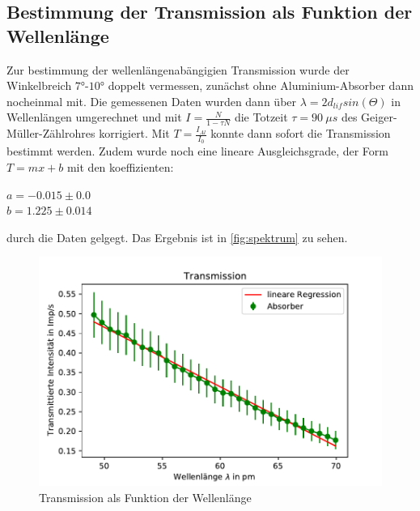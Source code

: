 \subsection{Bestimmung der Transmission als Funktion der Wellenlänge}
\label{sec:transmission}
Zur bestimmung der wellenlängenabängigien Transmission wurde der Winkelbreich $7°$-$10°$ doppelt vermessen,
zunächst ohne Aluminium-Absorber dann nocheinmal mit. Die gemessenen Daten wurden dann über $\lambda=2d_{lif}sin(\Theta)$
in Wellenlängen umgerechnet und mit $I=\frac{N}{1-\tau N}$ die Totzeit $\tau=\SI[]{90}[]{\mu s}$ des 
Geiger-Müller-Zählrohres korrigiert. Mit $T=\frac{I_{Al}}{I_0}$ konnte dann sofort die Transmission bestimmt
werden. Zudem wurde noch eine lineare Ausgleichsgrade, der Form $T=mx+b$ mit den koeffizienten:
\begin{center}
    $a=-0.015 \pm 0.0$\\
    $b=1.225 \pm 0.014$
\end{center}
durch die Daten gelgegt. Das Ergebnis ist in \autoref{fig:spektrum} zu sehen.

\begin{figure}
    \centering
    \includegraphics{spektrum.pdf}
    \caption{Transmission als Funktion der Wellenlänge}
    \label{fig:spektrum}
  \end{figure}


